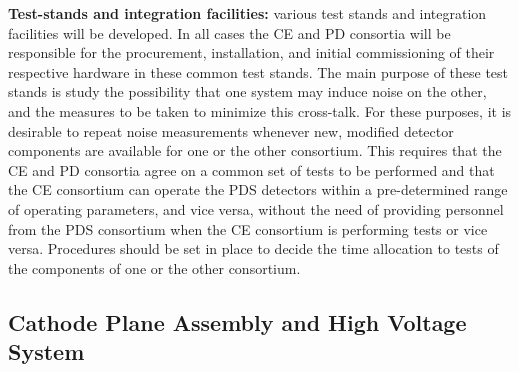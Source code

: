 \textbf{Test-stands and integration facilities: }various test stands and integration facilities will be developed. In all cases the CE and PD consortia will be responsible for the procurement, installation, and initial commissioning of their respective hardware in these common test stands. The main purpose of these test stands is study the possibility that one system may induce noise on the other, and the measures to be taken to minimize this cross-talk. For these purposes, it is desirable to repeat noise measurements whenever new, modified detector components are available for one or the other consortium. This requires that the CE and PD consortia agree on a common set of tests to be performed and that the CE consortium can operate the PDS detectors within a pre-determined range of operating parameters, and vice versa, without the need of providing personnel from the PDS consortium when the CE consortium is performing tests or vice versa. Procedures should be set in place to decide the time allocation to tests of the components of one or the other consortium.


\subsection{Cathode Plane Assembly and High Voltage System}
\label{sec:fdsp-pd-intfc-le}


